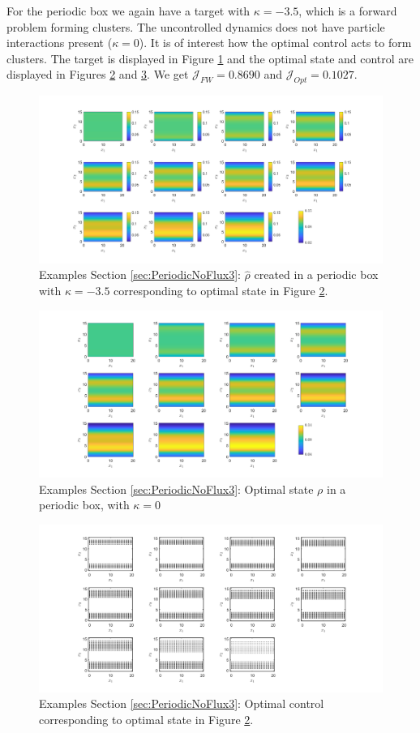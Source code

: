 \documentclass[11pt, a4paper]{article}
\theoremstyle{definition}
\newcommand{\hr}{\widehat \rho}
\begin{document}
For the periodic box we again have a target with $\kappa = -3.5$, which is a forward problem forming clusters. The uncontrolled dynamics does not have particle interactions present ($\kappa =0$). It is of interest how the optimal control acts to form clusters. The target is displayed in Figure \ref{F8} and the optimal state and control are displayed in Figures \ref{F8a} and \ref{F8b}. We get $\mathcal J_{FW} = 0.8690$ and $\mathcal J_{Opt} = 0.1027$.
\begin{figure}[h]
	\centering
	\includegraphics[scale=0.35]{rhoHatPeri8.png}
	\caption{Examples Section \ref{sec:PeriodicNoFlux3}: $\hr$ created in a periodic box with $\kappa = -3.5$ corresponding to optimal state in Figure \ref{F8a}.} 
	\label{F8}
\end{figure}
\begin{figure}[h]
	\centering
	\includegraphics[scale=0.35]{rhoOptPeri8.png}
	\caption{Examples Section \ref{sec:PeriodicNoFlux3}: Optimal state $\rho$ in a periodic box, with $\kappa = 0$} 
	\label{F8a}
\end{figure}

\begin{figure}[h]
	\centering
	\includegraphics[scale=0.35]{ConOptPeri8.png}
	\caption{Examples Section \ref{sec:PeriodicNoFlux3}: Optimal control corresponding to optimal state in Figure \ref{F8a}.} 
	\label{F8b}
\end{figure}
\end{document}
